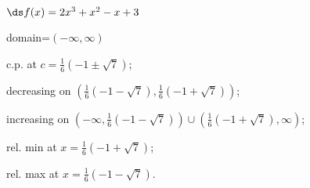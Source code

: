 {$\ds f(x) =2 x^3+x^2-x+3$
}
{domain=$(-\infty,\infty)$

c.p. at $ c=\frac16\left(-1\pm\sqrt{7}\right)$; 

decreasing on $ \left(\frac16\left(-1-\sqrt{7}\right),\frac16\left(-1+\sqrt{7}\right)\right)$;

increasing on $ \left(-\infty,\frac16\left(-1-\sqrt{7}\right)\right) \cup \left(\frac16\left(-1+\sqrt{7}\right),\infty\right)$;

rel. min at $ x=\frac16\left(-1+\sqrt{7}\right)$;

rel. max at $ x=\frac16\left(-1-\sqrt{7}\right)$.
}
